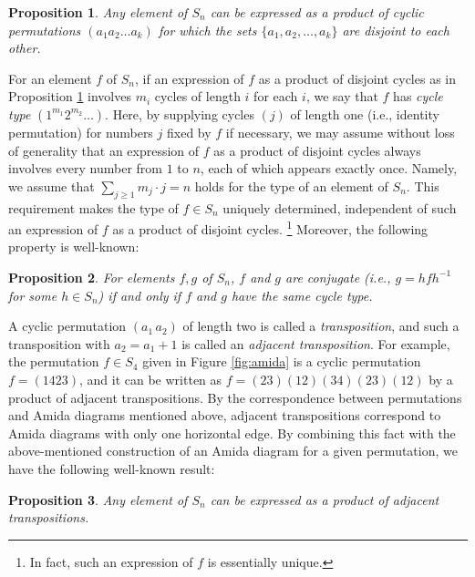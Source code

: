 \documentclass[11pt]{article}
\newtheorem{proposition}{Proposition}
\begin{document}
\begin{proposition}
\label{prop:disjoint_product_of_cyclic_permutation}
Any element of $S_n$ can be expressed as a product of cyclic permutations $(a_1a_2 \dots a_k)$ for which the sets $\{a_1,a_2,\dots,a_k\}$ are disjoint to each other.
\end{proposition}

For an element $f$ of $S_n$, if an expression of $f$ as a product of disjoint cycles as in Proposition \ref{prop:disjoint_product_of_cyclic_permutation} involves $m_i$ cycles of length $i$ for each $i$, we say that $f$ has \emph{cycle type} $(1^{m_1}2^{m_2} \dots)$.
Here, by supplying cycles $(j)$ of length one (i.e., identity permutation) for numbers $j$ fixed by $f$ if necessary, we may assume without loss of generality that an expression of $f$ as a product of disjoint cycles always involves every number from $1$ to $n$, each of which appears exactly once.
Namely, we assume that $\sum_{j \geq 1} m_j \cdot j = n$ holds for the type of an element of $S_n$.
This requirement makes the type of $f \in S_n$ uniquely determined, independent of such an expression of $f$ as a product of disjoint cycles.%
\footnote{In fact, such an expression of $f$ is essentially unique.}
Moreover, the following property is well-known:

\begin{proposition}
\label{prop:type_of_conjugate_permutations}
For elements $f,g$ of $S_n$, $f$ and $g$ are conjugate (i.e., $g = h f h^{-1}$ for some $h \in S_n$) if and only if $f$ and $g$ have the same cycle type.
\end{proposition}

A cyclic permutation $(a_1\,a_2)$ of length two is called a \emph{transposition}, and such a transposition with $a_2 = a_1 + 1$ is called an \emph{adjacent transposition}.
For example, the permutation $f \in S_4$ given in Figure \ref{fig:amida} is a cyclic permutation $f = (1423)$, and it can be written as $f = (23)(12)(34)(23)(12)$ by a product of adjacent transpositions.
By the correspondence between permutations and Amida diagrams mentioned above, adjacent transpositions correspond to Amida diagrams with only one horizontal edge.
By combining this fact with the above-mentioned construction of an Amida diagram for a given permutation, we have the following well-known result:

\begin{proposition}
\label{prop:generated_by_adjacent_transpositions}
Any element of $S_n$ can be expressed as a product of adjacent transpositions.
\end{proposition}
\end{document}

